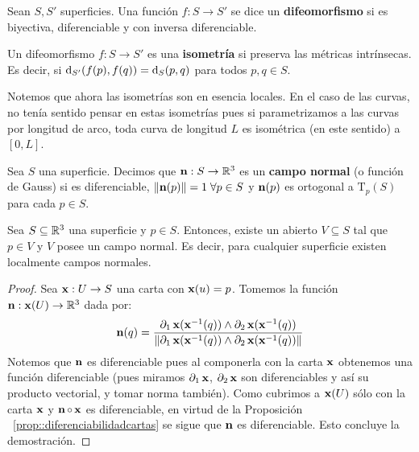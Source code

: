 \begin{defn}
Sean $S,S'$ superficies. Una función $f:S\to S'$ se dice un \textbf{difeomorfismo} si es biyectiva, diferenciable y con inversa diferenciable.
\end{defn}

\begin{defn}
Un difeomorfismo $f:S\to S'$ es una \textbf{isometría} si preserva las métricas intrínsecas. Es decir, si $\mathop{}\!\mathrm{d}_{S'}(f(p),f(q))=\mathop{}\!\mathrm{d}_S(p,q)$ para todos $p,q\in S$.
\end{defn}

\begin{obs}
Notemos que ahora las isometrías son en esencia locales. En el caso de las curvas, no tenía sentido pensar en estas isometrías pues si parametrizamos a las curvas por longitud de arco, toda curva de longitud $L$ es isométrica (en este sentido) a $[0,L]$.
\end{obs}

\begin{defn}
Sea $S$ una superficie. Decimos que $\operatorname{\mathbf{n}}:S\to\mathbb{R}^3$ es un \textbf{campo normal} (o función de Gauss) si es diferenciable, $\left\| \operatorname{\mathbf{n}}(p) \right\|=1\;\forall p\in S$ y $\operatorname{\mathbf{n}}(p)$ es ortogonal a $\mathrm{T}_p(S)$ para cada $p\in S$. 
\end{defn}

\begin{prop}
Sea $S\subseteq\mathbb{R}^3$ una superficie y $p\in S$. Entonces, existe un abierto $V\subseteq S$ tal que $p\in V$ y $V$ posee un campo normal. Es decir, para cualquier superficie existen localmente campos normales.
\begin{proof}
Sea $\operatorname{\mathbf{x}}:U\to S$ una carta con $\operatorname{\mathbf{x}}(u)=p$. Tomemos la función $\operatorname{\mathbf{n}}:\operatorname{\mathbf{x}}(U)\to\mathbb{R}^3$ dada por: $$\operatorname{\mathbf{n}}(q)=\dfrac{\partial_1\operatorname{\mathbf{x}}(\operatorname{\mathbf{x}}^{-1}(q))\wedge\partial_2\operatorname{\mathbf{x}}(\operatorname{\mathbf{x}}^{-1}(q))}{\left\| \partial_1\operatorname{\mathbf{x}}(\operatorname{\mathbf{x}}^{-1}(q))\wedge\partial_2\operatorname{\mathbf{x}}(\operatorname{\mathbf{x}}^{-1}(q)) \right\|}$$ Notemos que $\operatorname{\mathbf{n}}$ es diferenciable pues al componerla con la carta $\operatorname{\mathbf{x}}$ obtenemos una función diferenciable (pues miramos $\partial_1\operatorname{\mathbf{x}}$, $\partial_2\operatorname{\mathbf{x}}$ son diferenciables y así su producto vectorial, y tomar norma también). Como cubrimos a $\operatorname{\mathbf{x}}(U)$ sólo con la carta $\operatorname{\mathbf{x}}$ y $\operatorname{\mathbf{n}}\circ\operatorname{\mathbf{x}}$ es diferenciable, en virtud de la Proposición ~\ref{prop::diferenciabilidadcartas} se sigue que $\operatorname{\mathbf{n}}$ es diferenciable. Esto concluye la demostración.
\end{proof}
\end{prop}

